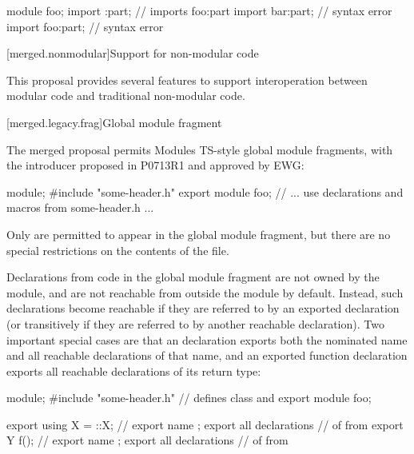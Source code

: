 \begin{codeblock}
module foo;
import :part;           // imports foo:part
import bar:part;        // syntax error
import foo:part;        // syntax error
\end{codeblock}

[merged.nonmodular]{Support for non-modular code}

\pnum
This proposal provides several features to support
interoperation between modular code
and traditional non-modular code.

[merged.legacy.frag]{Global module fragment}

\pnum
The merged proposal permits Modules TS-style global module fragments,
with the  introducer proposed in P0713R1
and approved by EWG:

\begin{codeblock}
module;
#include "some-header.h"
export module foo;
// ... use declarations and macros from some-header.h ...
\end{codeblock}

\pnum
Only  are permitted to appear
in the global module fragment,
but there are no special restrictions
on the contents of the  file.

\pnum
Declarations from code in the global module fragment
are not owned by the module,
and are not reachable from outside the module by default.
Instead, such declarations become reachable if they are referred to
by an exported declaration
(or transitively if they are referred to by another reachable declaration).
Two important special cases are that an 
declaration exports both the nominated name and
all reachable declarations of that name,
and an exported function declaration exports
all reachable declarations of its return type:

\begin{codeblock}
module;
#include "some-header.h" // defines class  and 
export module foo;

export using X = ::X; // export name ; export all declarations
                      // of  from 
export Y f(); // export name ; export all declarations
              // of  from 
\end{codeblock}

